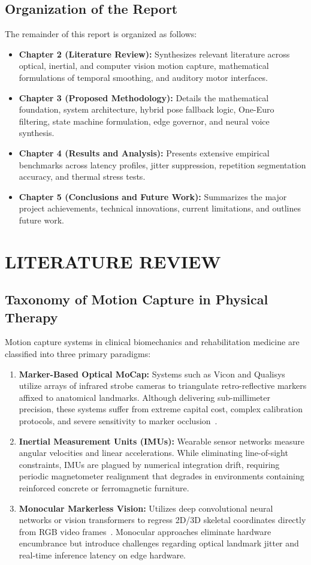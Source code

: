 \documentclass[12pt]{report}
\begin{document}
\section{Organization of the Report}
The remainder of this report is organized as follows:
\begin{itemize}
    \item \textbf{Chapter 2 (Literature Review):} Synthesizes relevant literature across optical, inertial, and computer vision motion capture, mathematical formulations of temporal smoothing, and auditory motor interfaces.
    \item \textbf{Chapter 3 (Proposed Methodology):} Details the mathematical foundation, system architecture, hybrid pose fallback logic, One-Euro filtering, state machine formulation, edge governor, and neural voice synthesis.
    \item \textbf{Chapter 4 (Results and Analysis):} Presents extensive empirical benchmarks across latency profiles, jitter suppression, repetition segmentation accuracy, and thermal stress tests.
    \item \textbf{Chapter 5 (Conclusions and Future Work):} Summarizes the major project achievements, technical innovations, current limitations, and outlines future work.
\end{itemize}

\chapter{LITERATURE REVIEW}

\section{Taxonomy of Motion Capture in Physical Therapy}
Motion capture systems in clinical biomechanics and rehabilitation medicine are classified into three primary paradigms:
\begin{enumerate}
    \item \textbf{Marker-Based Optical MoCap:} Systems such as Vicon and Qualisys utilize arrays of infrared strobe cameras to triangulate retro-reflective markers affixed to anatomical landmarks. Although delivering sub-millimeter precision, these systems suffer from extreme capital cost, complex calibration protocols, and severe sensitivity to marker occlusion~\cite{vanderkruk2018methods}.
    \item \textbf{Inertial Measurement Units (IMUs):} Wearable sensor networks measure angular velocities and linear accelerations. While eliminating line-of-sight constraints, IMUs are plagued by numerical integration drift, requiring periodic magnetometer realignment that degrades in environments containing reinforced concrete or ferromagnetic furniture.
    \item \textbf{Monocular Markerless Vision:} Utilizes deep convolutional neural networks or vision transformers to regress 2D/3D skeletal coordinates directly from RGB video frames~\cite{bazarevsky2020blazepose, maji2022yolopose}. Monocular approaches eliminate hardware encumbrance but introduce challenges regarding optical landmark jitter and real-time inference latency on edge hardware.
\end{enumerate}
\end{document}
